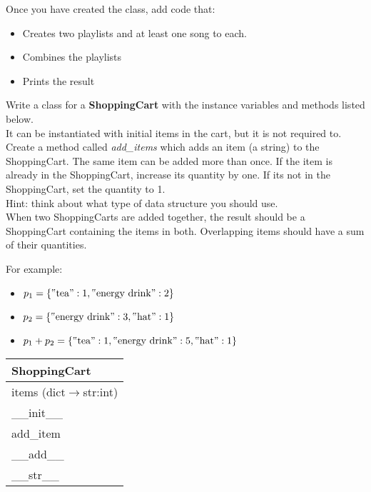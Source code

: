 		Once you have created the class, add code that:
		\begin{itemize}
			\item Creates two playlists and at least one song to each.
			\item Combines the playlists
			\item Prints the result
		\end{itemize}



	\item
		Write a class for a \textbf{ShoppingCart} with the instance variables and methods listed 
		below.\\
		It can be instantiated with initial items in the cart, but it is not required to.\\
		Create a method called \textit{add\_items} which adds an item (a string) to the 
		ShoppingCart. The same item can be added more than once. If the item is already in the 
		ShoppingCart, increase its quantity by one. If its not in the ShoppingCart, set the 
		quantity to 1.\\ Hint: think about what type of data structure you should use. \\
		When two ShoppingCarts are added together, the result should be a ShoppingCart 
		containing the items in both. Overlapping items should have a sum of their quantities.

		\begin{minipage}[t]{0.65\textwidth}
			For example:
			\begin{itemize}
				\item $p_1 = \{\csqt{tea}:1, \csqt{energy drink}:2 \}$
				\item $p_2 = \{\csqt{energy drink}:3, \csqt{hat}:1 \}$
				\item $p_1 + p_2 = \{\csqt{tea}:1, \csqt{energy drink}:5, \csqt{hat}:1 \}$
			\end{itemize}		
		\end{minipage}
		\hfill
		\begin{minipage}[t]{0.32\textwidth}
			\vspace{0.1em}
			\begin{flushright}
				\begin{tabular}{|l|} \hline
					ShoppingCart \\ \hline
					items (dict$\rightarrow$str:int) \\ \hline
					\_\_init\_\_ \\
					add\_item \\
					\_\_add\_\_ \\
					\_\_str\_\_ \\ \hline
				\end{tabular}
			\end{flushright}
		\end{minipage}
		
